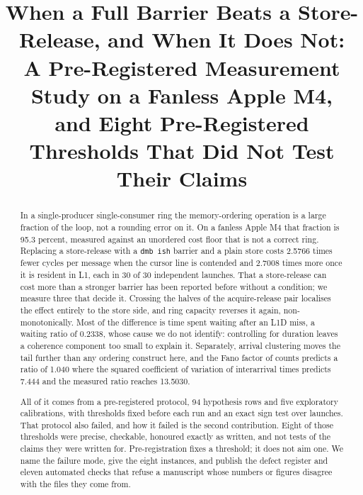 \documentclass[conference]{IEEEtran}
\begin{document}
\title{When a Full Barrier Beats a Store-Release, and When It Does Not:\\
A Pre-Registered Measurement Study on a Fanless Apple M4,\\
and Eight Pre-Registered Thresholds That Did Not Test Their Claims}

\author{
}

\maketitle
{}

\begin{abstract}
In a single-producer single-consumer ring the memory-ordering operation is a
large fraction of the loop, not a rounding error on it. On a fanless
Apple M4 that fraction is 95.3 percent, measured against an unordered cost
floor that is not a correct ring.
Replacing a store-release with a \texttt{dmb ish} barrier and a plain store
costs 2.5766 times fewer cycles per message when the cursor line is contended
and 2.7008 times more once it is resident in L1, each in 30 of 30 independent
launches. That a store-release can cost more than a stronger barrier has been
reported before without a condition; we measure three that decide it. Crossing the halves of the acquire-release pair localises the effect
entirely to the store side, and ring capacity reverses it again,
non-monotonically. Most of the difference is time spent waiting after an L1D
miss, a waiting ratio of 0.2338, whose cause we do not identify: controlling
for duration leaves a coherence component too small to explain it. Separately,
arrival clustering moves the tail further than any ordering construct here, and
the Fano factor of counts predicts a ratio of 1.040 where the squared
coefficient of variation of interarrival times predicts 7.444 and the measured
ratio reaches 13.5030.

All of it comes from a pre-registered protocol, 94 hypothesis rows and five
exploratory calibrations, with thresholds fixed before each run and an exact
sign test over launches. That protocol also failed, and how it failed is the
second contribution. Eight of those thresholds were precise, checkable,
honoured exactly as written, and not tests of the claims they were written for.
Pre-registration fixes a threshold; it does not aim one. We name the failure
mode, give the eight instances, and publish the defect register and eleven
automated checks that refuse a manuscript whose numbers or figures disagree
with the files they come from.
\end{abstract}
\end{document}
